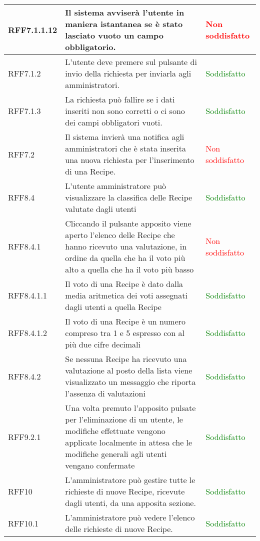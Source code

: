 \begin{center}
\begin{longtable}{| p{2.5cm} | p{8cm} | p{3.5cm} |}
		\hline
		RFF7.1.1.12 & Il sistema avviserà l'utente in maniera istantanea se è stato lasciato vuoto un campo obbligatorio. & \textcolor{red}{ Non soddisfatto} \\
		\hline
		RFF7.1.2 & L'utente deve premere sul pulsante di invio della richiesta per inviarla agli amministratori. & \textcolor{green}{Soddisfatto}  \\
		\hline
		RFF7.1.3 & La richiesta può fallire se i dati inseriti non sono corretti o ci sono dei campi obbligatori vuoti. & \textcolor{green}{Soddisfatto}  \\
		\hline
		RFF7.2  & Il sistema invierà una notifica agli amministratori che è stata inserita una nuova richiesta per l'inserimento di una Recipe. & \textcolor{red}{ Non soddisfatto} \\
		\hline
		RFF8.4 & L'utente amministratore può visualizzare la classifica delle Recipe valutate dagli utenti  & \textcolor{green}{Soddisfatto}  \\
		\hline
		RFF8.4.1 & Cliccando il pulsante apposito viene aperto l'elenco delle Recipe che hanno ricevuto una valutazione, in ordine da quella che ha il voto più alto a quella che ha il voto più basso  & \textcolor{red}{ Non soddisfatto}  \\
		\hline
		RFF8.4.1.1 & Il voto di una Recipe è dato dalla media aritmetica dei voti assegnati dagli utenti a quella Recipe  & \textcolor{green}{Soddisfatto}  \\
		\hline
		RFF8.4.1.2 & Il voto di una Recipe è un numero compreso tra 1 e 5 espresso con al più due cifre decimali  &  \textcolor{green}{Soddisfatto}  \\
		\hline
		RFF8.4.2 & Se nessuna Recipe ha ricevuto una valutazione al posto della lista viene visualizzato un messaggio che riporta l'assenza di valutazioni  & \textcolor{green}{Soddisfatto}  \\
		\hline
		RFF9.2.1  &  Una volta premuto l'apposito pulsate per l'eliminazione di un utente, le modifiche effettuate vengono applicate localmente in attesa che le modifiche generali agli utenti vengano confermate  &  \textcolor{green}{Soddisfatto} \\
		\hline
		RFF10  &  L'amministratore può gestire tutte le richieste di nuove Recipe, ricevute dagli utenti, da una apposita sezione.  & \textcolor{green}{Soddisfatto} \\
		\hline
		RFF10.1  &  L'amministratore può vedere l'elenco delle richieste di nuove Recipe.  & \textcolor{green}{Soddisfatto} \\

\end{longtable}
\end{center}

